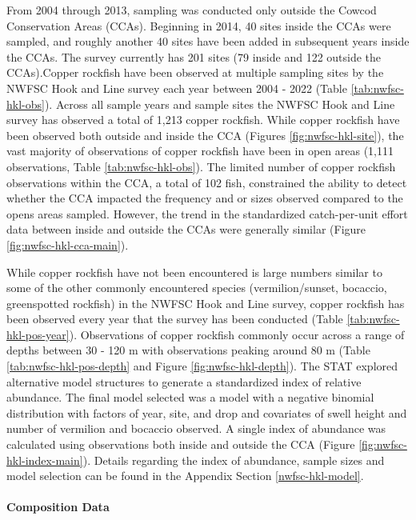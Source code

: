 \documentclass[11pt,
  english,
  letterpaper,
]{article}
\begin{document}
From 2004 through 2013, sampling was conducted only outside the Cowcod Conservation Areas (CCAs). Beginning in 2014, 40 sites inside the CCAs were sampled, and roughly another 40 sites have been added in subsequent years inside the CCAs. The survey currently has 201 sites (79 inside and 122 outside the CCAs).Copper rockfish have been observed at multiple sampling sites by the NWFSC Hook and Line survey each year between 2004 - 2022 (Table \ref{tab:nwfsc-hkl-obs}). Across all sample years and sample sites the NWFSC Hook and Line survey has observed a total of 1,213 copper rockfish. While copper rockfish have been observed both outside and inside the CCA (Figures \ref{fig:nwfsc-hkl-site}), the vast majority of observations of copper rockfish have been in open areas (1,111 observations, Table \ref{tab:nwfsc-hkl-obs}). The limited number of copper rockfish observations within the CCA, a total of 102 fish, constrained the ability to detect whether the CCA impacted the frequency and or sizes observed compared to the opens areas sampled. However, the trend in the standardized catch-per-unit effort data between inside and outside the CCAs were generally similar (Figure \ref{fig:nwfsc-hkl-cca-main}).

While copper rockfish have not been encountered is large numbers similar to some of the other commonly encountered species (vermilion/sunset, bocaccio, greenspotted rockfish) in the NWFSC Hook and Line survey, copper rockfish has been observed every year that the survey has been conducted (Table \ref{tab:nwfsc-hkl-pos-year}). Observations of copper rockfish commonly occur across a range of depths between 30 - 120 m with observations peaking around 80 m (Table \ref{tab:nwfsc-hkl-pos-depth} and Figure \ref{fig:nwfsc-hkl-depth}). The STAT explored alternative model structures to generate a standardized index of relative abundance. The final model selected was a model with a negative binomial distribution with factors of year, site, and drop and covariates of swell height and number of vermilion and bocaccio observed. A single index of abundance was calculated using observations both inside and outside the CCA (Figure \ref{fig:nwfsc-hkl-index-main}). Details regarding the index of abundance, sample sizes and model selection can be found in the Appendix Section \ref{nwfsc-hkl-model}.

\hypertarget{composition-data-3}{%
\paragraph{Composition Data}\label{composition-data-3}}
\end{document}
